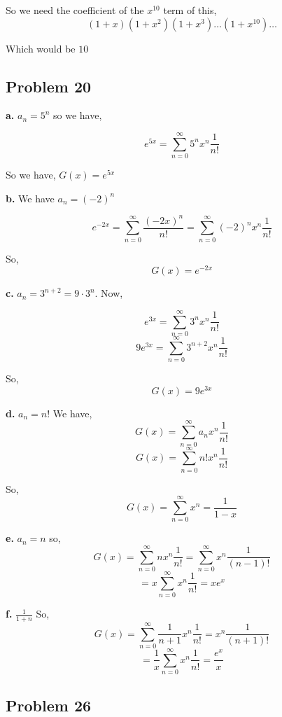 \documentclass[a4paper]{report}
\begin{document}
So we need the coefficient of the $x^{10}$ term of this, 
$$ (1 + x)(1 + x^2)(1 + x^{3}) \dots (1 + x^{10}) \dots $$ 

Which would be $10$
\subsection*{Problem 20}
\textbf{a. }  $a_n = 5^{n}$ so we have, 

$$ e^{5x} = \sum_{n=0}^{\infty} 5^{n}x^{n} \frac{1}{n!} $$ 

So we have, $G(x) = e^{5x}$


\textbf{b. }  We have $a_n = (-2)^{n}$

$$ e^{-2x} = \sum_{n=0}^{\infty} \frac{(-2x)^{n}}{n!} = \sum_{n=0}^{\infty} (-2)^{n} x^{n} \frac{1}{n!} $$ 

So, 
$$ G(x) =e^{-2x}$$

\textbf{c. }  $a_n = 3^{n + 2} = 9 \cdot 3^{n}$. Now, 

$$ e^{3x} = \sum_{n=0}^{\infty} 3^{n}x^{n} \frac{1}{n!} $$ 
$$ 9e^{3x} = \sum_{n=0}^{\infty} 3^{n + 2} x^{n} \frac{1}{n!} $$ 

So, 
$$ G(x) = 9e^{3x} $$ 

\textbf{d. } $a_n = n!$ 
We have, 
$$ G(x) = \sum_{n=0}^{\infty} a_n x^{n} \frac{1}{n!} $$ 
$$ G(x) = \sum_{n=0}^{\infty} n! x^{n} \frac{1}{n!} $$ 

So, 
$$ G(x) = \sum_{n=0}^{\infty} x^{n} = \frac{1}{1 - x} $$ 

\textbf{e.}  $a_n = n$ so,  
$$ G(x) = \sum_{n=0}^{\infty} n x^{n} \frac{1}{n!} = \sum_{n=0}^{\infty} x^{n} \frac{1}{(n - 1)!} $$ 
$$ = x \sum_{n=0}^{\infty} x^{n} \frac{1}{n!} = x e^{x} $$ 


 \textbf{f. } $\frac{1}{1 + n}$
 So, 
 $$ G(x) = \sum_{n=0}^{\infty} \frac{1}{n + 1} x^{n} \frac{1}{n!} = x^{n} \frac{1}{(n + 1)!} $$ 
 $$ = \frac{1}{x} \sum_{n=0}^{\infty} x^{n } \frac{1}{n!} = \frac{e^{x}}{x} $$ 
\subsection*{Problem 26}
\end{document}
